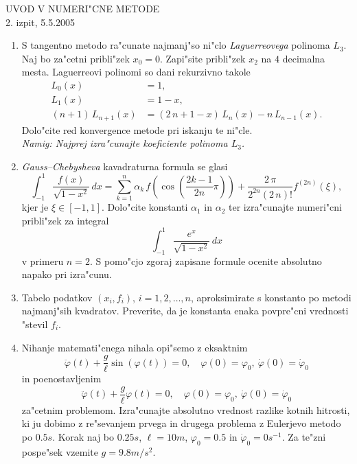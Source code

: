 \documentclass[12pt,a4paper]{article}
\begin{document}
\begin{center}
  {\large UVOD V NUMERI"CNE METODE\\
    2. izpit, 5.5.2005\\
    }
\end{center}
\vspace{1cm}

\begin{enumerate}

  \item S tangentno metodo ra"cunate najmanj"so ni"clo
      {\sl Laguerreovega} polinoma $L_3$. Naj bo za"cetni pribli"zek
      $x_0=0$. Zapi"site pribli"zek $x_2$ na $4$ decimalna mesta.
      Laguerreovi polinomi so dani rekurzivno takole
      \begin{align*}
        L_0(x)&=1,\\
        L_1(x)&=1-x,\\
        (n+1)\,L_{n+1}(x)&=(2\,n+1-x)\,L_n(x)-n\,L_{n-1}(x).
      \end{align*}
      Dolo"cite red konvergence metode pri iskanju te ni"cle.\\
      {\sl Namig: Najprej izra"cunajte koeficiente polinoma $L_3$.}
  
  \item {\sl Gauss--Chebysheva} kavadraturna formula
      se glasi
      $$\int_{-1}^{1}\frac{f(x)}{\sqrt{1-x^2}}\,dx=
        \sum_{k=1}^n \alpha_k\,f\left(\cos\left(\frac{2k-1}{2n}\pi\right)\right)+
        \frac{2\,\pi}{2^{2n}(2\,n)!}f^{(2n)}(\xi),$$ 
      kjer je $\xi\in[-1,1]$. 
      Dolo"cite konstanti $\alpha_1$ in $\alpha_2$ ter 
      izra"cunajte numeri"cni pribli"zek
      za integral
      $$\int_{-1}^{1}\frac{e^{x}}{\sqrt{1-x^2}}\,dx$$
      v primeru $n=2$. S pomo"cjo zgoraj zapisane formule
      ocenite absolutno napako pri izra"cunu.

  \item Tabelo podatkov $(x_i,f_i)$, $i=1,2,\dots,n$, 
      aproksimirate s konstanto po metodi
      najmanj"sih kvadratov. Preverite, da je konstanta enaka povpre"cni vrednosti
      "stevil $f_i$.  

  \item Nihanje matemati"cnega nihala opi"semo z eksaktnim  
    $$\ddot\varphi(t)+\frac{g}{\ell}\sin(\varphi(t))=0, \quad \varphi(0)=\varphi_0,\ 
      \dot\varphi(0)=\dot\varphi_0$$
    in poenostavljenim 
     $$\ddot\varphi(t)+\frac{g}{\ell}\varphi(t)=0, \quad \varphi(0)=\varphi_0,\ 
      \dot\varphi(0)=\dot\varphi_0$$
    za"cetnim problemom. 
    Izra"cunajte absolutno vrednost razlike kotnih hitrosti, 
    ki ju dobimo z re"sevanjem prvega in drugega
    problema z Eulerjevo metodo po $0.5s$. Korak naj bo $0.25s$, $\ell=10m$,
    $\varphi_0=0.5$ in $\dot\varphi_0=0s^{-1}$. Za te"zni pospe"sek vzemite
    $g=9.8m/s^2$.

\end{enumerate}
\end{document}
